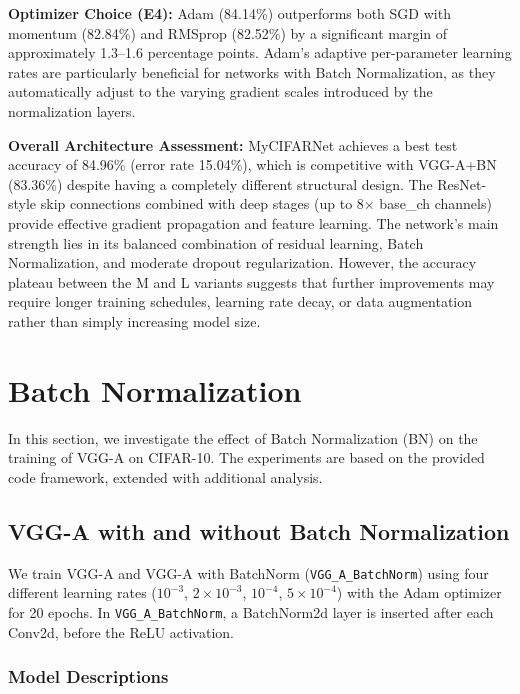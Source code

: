 \documentclass[11pt,a4paper]{article}
\begin{document}
\textbf{Optimizer Choice (E4):} Adam (84.14\%) outperforms both SGD with momentum (82.84\%) and RMSprop (82.52\%) by a significant margin of approximately 1.3--1.6 percentage points. Adam's adaptive per-parameter learning rates are particularly beneficial for networks with Batch Normalization, as they automatically adjust to the varying gradient scales introduced by the normalization layers.

\textbf{Overall Architecture Assessment:} MyCIFARNet achieves a best test accuracy of 84.96\% (error rate 15.04\%), which is competitive with VGG-A+BN (83.36\%) despite having a completely different structural design. The ResNet-style skip connections combined with deep stages (up to 8$\times$ base\_ch channels) provide effective gradient propagation and feature learning. The network's main strength lies in its balanced combination of residual learning, Batch Normalization, and moderate dropout regularization. However, the accuracy plateau between the M and L variants suggests that further improvements may require longer training schedules, learning rate decay, or data augmentation rather than simply increasing model size.

\section{Batch Normalization}

In this section, we investigate the effect of Batch Normalization (BN) on the training of VGG-A on CIFAR-10. The experiments are based on the provided code framework, extended with additional analysis.

\subsection{VGG-A with and without Batch Normalization}

We train VGG-A and VGG-A with BatchNorm (\texttt{VGG\_A\_BatchNorm}) using four different learning rates ($10^{-3}$, $2\times10^{-3}$, $10^{-4}$, $5\times10^{-4}$) with the Adam optimizer for 20 epochs. In \texttt{VGG\_A\_BatchNorm}, a BatchNorm2d layer is inserted after each Conv2d, before the ReLU activation.

\subsubsection{Model Descriptions}
\end{document}
